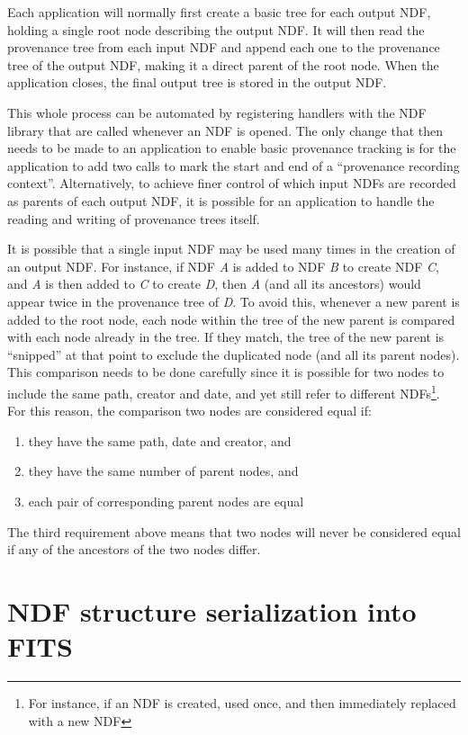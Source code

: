 \documentclass[final,authoryear,5p,times,twocolumn]{elsarticle}
\begin{document}
Each application will normally first create a basic tree for each output
NDF, holding a single root node describing the output NDF. It will then
read the provenance tree from each input NDF and append each one to the
provenance tree of the output NDF, making it a direct parent of the root
node. When the application closes, the final output tree is stored in
the output NDF.

This whole process can be automated by registering handlers with the NDF
library that are called whenever an NDF is opened. The only change that
then needs to be made to an application to enable basic provenance tracking is for the
application to add two calls to mark the start and end of a ``provenance
recording context''. Alternatively, to achieve finer control of which
input NDFs are recorded as parents of each output NDF, it is possible for
an application to handle the reading and writing of provenance trees
itself.

It is possible that a single input NDF may be used many times in the
creation of an output NDF. For instance, if NDF \emph{A} is added to NDF
\emph{B} to create NDF \emph{C}, and \emph{A} is then added to \emph{C} to create
\emph{D}, then \emph{A} (and all its ancestors) would appear twice in the
provenance tree of \emph{D}. To avoid this, whenever a new parent is added to
the root node, each node within the tree of the new parent is compared with
each node already in the tree. If they match, the tree of the new parent
is ``snipped'' at that point to exclude the duplicated node (and all its
parent nodes). This comparison needs to be done carefully since it is
possible for two nodes to include the same path, creator and date, and
yet still refer to different NDFs\footnote{For instance, if an NDF is
created, used once, and then immediately replaced with a new NDF}. For
this reason, the comparison two nodes are considered equal if:

\begin{enumerate}
\item they have the same path, date and creator, and
\item they have the same number of parent nodes, and
\item each pair of corresponding parent nodes are equal
\end{enumerate}

The third requirement above means that two nodes will never be considered
equal if any of the ancestors of the two nodes differ.

\section{NDF structure serialization into FITS}
\label{app:ndf2fits}
\end{document}
